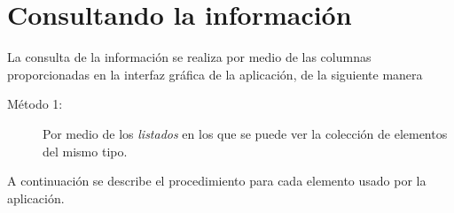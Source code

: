 \chapter{Consultando la informaci\'on}
\label{sec:consultandoLaInformacion}
La consulta de la informaci\'on se realiza por medio de las columnas proporcionadas en la interfaz gr\'afica de la aplicaci\'on, de la siguiente manera

\begin{description}
  \item[M\'etodo 1:]Por medio de los \emph{listados} en los que se puede ver la
  colecci\'on de elementos del mismo tipo.
  
\end{description}

A continuaci\'on se describe el procedimiento para cada elemento usado por la
aplicaci\'on.
















